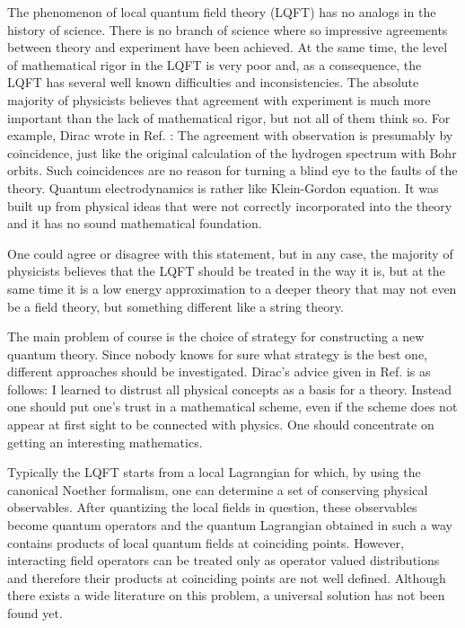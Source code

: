 \documentclass[a4paper,12pt]{article}%
\begin{document}
The phenomenon of local quantum field theory (LQFT) has no 
analogs in the history of science. There is no branch of 
science where so impressive agreements between theory and 
experiment have been
achieved. At the same time, the level of mathematical rigor 
in the LQFT is very poor and, as a consequence,
the LQFT has several well known difficulties and 
inconsistencies. The absolute majority of physicists believes
that agreement with experiment is much more important than the
lack of mathematical rigor, but not all of them think so.
For example, Dirac wrote in Ref. \cite{DirMath}: 
\coordHE{}The agreement
with observation is presumably by coincidence, just like the
original calculation of the hydrogen spectrum with Bohr orbits.
Such coincidences are no reason for turning a blind eye to the
faults of the theory. Quantum electrodynamics is rather like
Klein-Gordon equation. It was built up from physical ideas
that were not correctly incorporated into the theory and it
has no sound mathematical foundation.\coordHE{}  

One could agree or disagree with this statement, but in any
case, the majority of physicists believes that the LQFT should
be treated \cite{Wein} \coordHE{}in the way it is\coordHE{}, but at the same
time it is \cite{Wein} a \coordHE{}low energy approximation to a
deeper theory that may not even be a field theory, but something
different like a string theory\coordHE{}. 

The main problem of course is the choice of strategy
for constructing a new quantum theory. Since 
nobody knows for sure what strategy is the best one, 
different approaches should be investigated. Dirac's 
advice given in Ref. \cite{DirMath} is as follows: 
\coordHE{}I learned to distrust all
physical concepts as a basis for a theory. Instead one should
put one's trust in a mathematical scheme, even if the scheme
does not appear at first sight to be connected with physics.
One should concentrate on getting an interesting mathematics.\coordHE{} 

Typically the LQFT starts from a local Lagrangian for which, by
using the canonical Noether formalism, one can determine a set of
conserving physical observables. After quantizing the local fields
in question, these observables become quantum operators 
and the quantum Lagrangian obtained in such a way contains
products of local quantum fields at coinciding points. 
However, interacting field operators can be treated only
as operator valued distributions \cite{Haag} and therefore their
products at coinciding points are not well defined.
Although there exists a wide literature on this problem, 
a universal solution has not been found yet.
\end{document}
